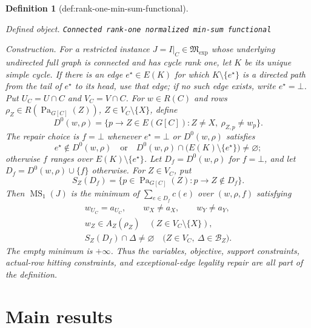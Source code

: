 \documentclass{article}
\newtheorem{definition}{Definition}
\begin{document}
\begin{definition}[def:rank-one-min-sum-functional]\label{def:rank-one-min-sum-functional}
\par\smallskip\noindent\emph{Defined object.} \texttt{Connected rank-\allowbreak{}one normalized min-\allowbreak{}sum functional}
\par\smallskip\noindent\emph{Construction.} For a restricted instance \(J=I|_C\in\mathfrak M_{\mathrm{exp}}\) whose underlying undirected full graph is connected and has cycle rank one, let \(K\) be its unique simple cycle.  If there is an edge \(e^\star\in E(K)\) for which \(K\setminus\{e^\star\}\) is a directed path from the tail of \(e^\star\) to its head, use that edge; if no such edge exists, write \(e^\star=\bot\).  Put \(U_C=U\cap C\) and \(V_C=V\cap C\).  For \(w\in R(C)\) and rows \(\rho_Z\in R(\operatorname{Pa}_{G[C]}(Z))\), \(Z\in V_C\setminus\{X\}\), define
\[
 D^0(w,\rho)=\{p\to Z\in E(G[C]):Z\ne X,\ \rho_{Z,p}\ne w_p\}.
\]
The repair choice is \(f=\bot\) whenever \(e^\star=\bot\) or \(D^0(w,\rho)\) satisfies
\[
 e^\star\notin D^0(w,\rho)
 \quad\text{or}\quad
 D^0(w,\rho)\cap\bigl(E(K)\setminus\{e^\star\}\bigr)\ne\varnothing;
\]
otherwise \(f\) ranges over \(E(K)\setminus\{e^\star\}\).  Let \(D_f=D^0(w,\rho)\) for \(f=\bot\), and let \(D_f=D^0(w,\rho)\cup\{f\}\) otherwise.  For \(Z\in V_C\), put
\[
 S_Z(D_f)=\{p\in\operatorname{Pa}_{G[C]}(Z):p\to Z\notin D_f\}.
\]
Then \(\operatorname{MS}_1(J)\) is the minimum of \(\sum_{e\in D_f}c(e)\) over \((w,\rho,f)\) satisfying
\[
 \begin{gathered}
 w_{U_C}=a_{U_C},\qquad w_X\ne a_X,\qquad w_Y\ne a_Y,\\
 w_Z\in A_Z(\rho_Z)\quad(Z\in V_C\setminus\{X\}),\\
 S_Z(D_f)\cap\Delta\ne\varnothing
 \quad\bigl(Z\in V_C,\ \Delta\in\mathcal B_Z\bigr).
 \end{gathered}
\]
The empty minimum is \(+\infty\).  Thus the variables, objective, support constraints, actual-row hitting constraints, and exceptional-edge legality repair are all part of the definition.
\end{definition}

\section{Main results}
\end{document}
